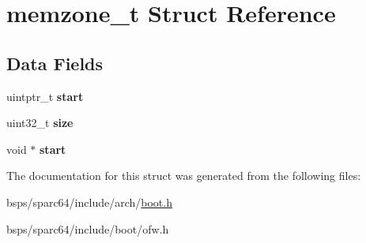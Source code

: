 \hypertarget{structmemzone__t}{}\section{memzone\+\_\+t Struct Reference}
\label{structmemzone__t}
\subsection*{Data Fields}
\begin{DoxyCompactItemize}
\item 
\mbox{\label{structmemzone__t_ab2991562a16ab34cc785bacecda354a7}} 
uintptr\+\_\+t {\bfseries start}
\item 
\mbox{\label{structmemzone__t_aa5fe78338233767572f7dc9839ea68ba}} 
uint32\+\_\+t {\bfseries size}
\item 
\mbox{\label{structmemzone__t_ab32d2d7e8c4e3a41c316b6ae3ba36419}} 
void $\ast$ {\bfseries start}
\end{DoxyCompactItemize}


The documentation for this struct was generated from the following files\+:\begin{DoxyCompactItemize}
\item 
bsps/sparc64/include/arch/\mbox{\hyperlink{sparc64_2include_2arch_2boot_8h}{boot.\+h}}\item 
bsps/sparc64/include/boot/ofw.\+h\end{DoxyCompactItemize}
